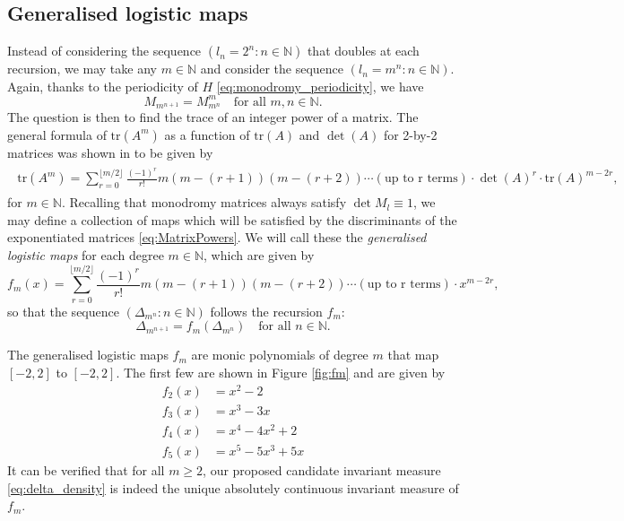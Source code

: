 \documentclass[a4paper]{article}
\theoremstyle{definition}
\numberwithin{equation}{section}
\numberwithin{theorem}{section}
\newcommand{\tr}{\mathrm{tr}}
\begin{document}
{\subsection{Generalised logistic maps} \label{sec:generalised_logistic}

Instead of considering the sequence $(l_n=2^n:{n\in\mathbb{N}})$ that doubles at each recursion, we may take any $m\in\mathbb{N}$ and consider the sequence $(l_n=m^n:{n\in\mathbb{N}})$. Again, thanks to the periodicity of $H$ \eqref{eq:monodromy_periodicity}, we have
\begin{equation} \label{eq:MatrixPowers}
    M_{m^{n+1}} = M_{m^n}^m\quad\text{for all $m,n\in\mathbb{N}$}.
\end{equation}
The question is then to find the trace of an integer power of a matrix. The general formula of $\tr(A^m)$ as a function of $\tr (A)$ and $\det (A)$ for 2-by-2 matrices was shown in \cite{pahade2015trace} to be given by
\begin{align*}
    \begin{split}
        \tr(A^m)=\sum_{r=0}^{\lfloor m/2 \rfloor}\frac{(-1)^r}{r!}m(m-(r+1))(m-(r+2))\cdots (\mbox{up to r terms})\cdot \det(A)^r\cdot \tr(A)^{m-2r},
    \end{split}
\end{align*}
for $m\in\mathbb{N}$. Recalling that monodromy matrices always satisfy $\det M_l\equiv1$, we may define a collection of maps which will be satisfied by the discriminants of the exponentiated matrices \eqref{eq:MatrixPowers}. We will call these the \emph{generalised logistic maps} for each degree $m\in\mathbb{N}$, which are given by
\begin{equation} \label{eq:generalised_logistic_def}
    f_m(x) =  \sum_{r=0}^{\lfloor m/2 \rfloor} \frac{(-1)^r}{r!}m(m-(r+1))(m-(r+2))\cdots (\mbox{up to r terms})\cdot x^{m-2r},
\end{equation}
so that the sequence $(\Delta_{m^n}:{n\in\mathbb{N}})$ follows the recursion $f_m$:
\begin{equation*} 
    \Delta_{m^{n+1}} = f_m(\Delta_{m^n})\quad\text{for all $n\in\mathbb{N}$.}
\end{equation*}

The generalised logistic maps $f_m$ are monic polynomials of degree $m$ that map $[-2,2]$ to $[-2,2]$. The first few are shown in Figure \ref{fig:fm} and are given by
\begin{align*}
    f_2(x)&=x^2-2\\
    f_3(x)&=x^3-3x\\
    f_4(x)&=x^4-4x^2+2\\
    f_5(x)&=x^5-5x^3+5x
\end{align*}
It can be verified that for all $m\geq2$, our proposed candidate invariant measure \eqref{eq:delta_density} is indeed the unique absolutely continuous invariant measure of $f_m$.

}
\end{document}
